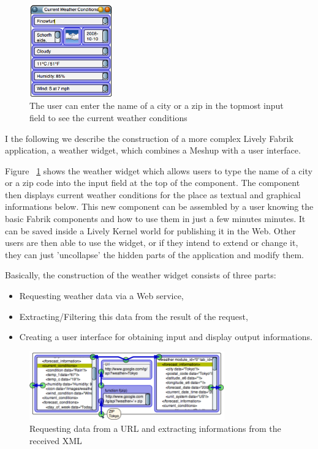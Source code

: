 \documentclass[pdftex, times, 10pt, twocolumn]{article}
\begin{document}
\begin{figure}[h]\centering
\includegraphics[width=0.320000\textwidth]{weatherExample03.png} 

\caption{The user can enter the name of a city or a zip in the topmost input field to see the current weather conditions }
\label{fig:WeatherExample}
\end{figure}
I the following we describe the construction of a more complex Lively Fabrik application, a weather widget, which combines a Meshup with a user interface. 

Figure ~\ref{fig:WeatherExample} shows the weather widget which allows users to type the name of a city or a zip code into the input field at the top of the component. The component then displays current weather conditions for the place as textual and graphical informations below. This new component can be assembled by a user knowing the basic Fabrik components and how to use them in just a few minutes minutes. It can be saved inside a Lively Kernel world for publishing it in the Web. Other users are then able to use the widget, or if they intend to extend or change it, they can just 'uncollapse' the hidden parts of the application and modify them. 

Basically, the construction of the weather widget consists of three parts: 


\begin{itemize}
  \item Requesting weather data via a Web service, 
  \item Extracting/Filtering this data from the result of the request, 
  \item Creating a user interface for obtaining input and display output informations. 
\end{itemize}


\begin{figure}[t]\centering
\includegraphics[width=0.750000\textwidth]{weatherExample09.png} 

\caption{Requesting data from a URL and extracting informations from the received XML }
\label{fig:WebrequestInWeatherExample}
\end{figure}
\end{document}
